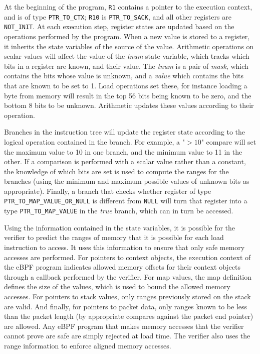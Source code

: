 \documentclass[10pt]{sig-alternate-05-2015}
\begin{document}
At the beginning of the program, \texttt{R1} contains a pointer to the execution
context, and is of type \texttt{PTR\_TO\_CTX}; \texttt{R10} is \texttt{PTR\_TO\_SACK}, and all other
registers are \texttt{NOT\_INIT}. At each execution step, register states are updated
based on the operations performed by the program. When a new value is stored to
a register, it inherits the state variables of the source of the value.
Arithmetic operations on scalar values will affect the value of the \emph{tnum} state
variable, which tracks which bits in a register are known, and their value. The
\emph{tnum} is a pair of \emph{mask}, which contains the bits whose value is unknown, and
a \emph{value} which contains the bits that are known to be set to 1. Load operations
set these, for instance loading a byte from memory will result in the top 56
bits being known to be zero, and the bottom 8 bits to be unknown. Arithmetic
updates these values according to their operation.

Branches in the instruction tree will update the register state according to the
logical operation contained in the branch. For example, a "\(>10\)" compare will
set the maximum value to 10 in one branch, and the minimum value to 11 in the
other. If a comparison is performed with a scalar value rather than a constant,
the knowledge of which bits are set is used to compute the ranges for the
branches (using the minimum and maximum possible values of unknown bits as
appropriate). Finally, a branch that checks whether register of type
\texttt{PTR\_TO\_MAP\_VALUE\_OR\_NULL} is different from \texttt{NULL} will turn that register into
a type \texttt{PTR\_TO\_MAP\_VALUE} in the \emph{true} branch, which can in turn be accessed.

Using the information contained in the state variables, it is possible for the
verifier to predict the ranges of memory that it is possible for each load
instruction to access. It uses this information to ensure that only safe memory
accesses are performed. For pointers to context objects, the execution context
of the eBPF program indicates allowed memory offsets for their context objects
through a callback performed by the verifier. For map values, the map definition
defines the size of the values, which is used to bound the allowed memory
accesses. For pointers to stack values, only ranges previously stored on the
stack are valid. And finally, for pointers to packet data, only ranges known to
be less than the packet length (by appropriate compares against the packet end
pointer) are allowed. Any eBPF program that makes memory accesses that the
verifier cannot prove are safe are simply rejected at load time. The verifier
also uses the range information to enforce aligned memory accesses.
\end{document}
